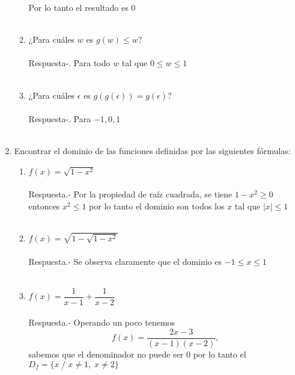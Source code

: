 \begin{enumerate}
\begin{enumerate}[\bfseries (i)]
	    Por lo tanto el resultado es $0$\\\\

	    \item ¿Para cuáles $w$ es $g(w)\leq w $?\\\\
	    Respuesta-. \; Para todo $w$ tal que $0\leq w\leq 1$\\\\

	    \item ¿Para cuáles $\epsilon$ es $g(g(\epsilon)) = g(\epsilon)$?\\\\
	    Respuesta-. \; Para $-1,0,1$\\\\ 

	\end{enumerate}

	\item Encontrar el dominio de las funciones definidas por las siguientes fórmulas:
	    \begin{enumerate}[\bfseries (i)]

	    \item $f(x)=\sqrt{1-x^2}$\\\\
	    Respuesta.- \; Por la propiedad de raíz cuadrada, se tiene  $1-x^2 \geq 0$ entonces $x^2 \leq 1$ por lo tanto el dominio son todos los $x$ tal que $|x| \leq 1$\\\\

	    \item $f(x)=\sqrt{1-\sqrt{1-x^2}}$\\\\
	    Respuesta.- \; Se observa claramente que el dominio es $-1\leq x \leq 1$\\\\

	    \item $f(x)=\dfrac{1}{x-1} + \dfrac{1}{x-2}$\\\\
	    Respuesta.- \; Operando un poco tenemos $$f(x) = \dfrac{2x-3}{(x-1)(x-2)},$$ sabemos que el denominador no puede ser $0$ por lo tanto el $D_{f} = \lbrace x\; / \; x \neq 1, \; x\neq  2 \rbrace$\\\\ 
    

\end{enumerate}
\end{enumerate}
